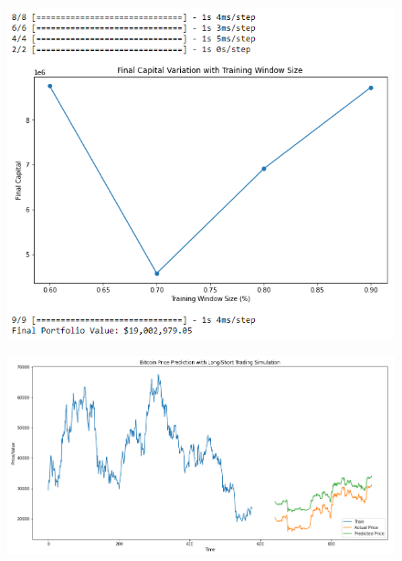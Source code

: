 \begin{figure}[H]
\centering
\includegraphics[scale=0.65]{fig30.jpg}
\end{figure}

\begin{figure}[H]
\centering
\includegraphics[scale=0.65]{fig31.jpg}
\end{figure}

